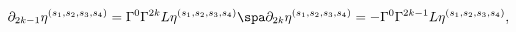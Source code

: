 \begin{equation}
\label{spacecomp1}
\partial_{2k-1} \eta^{(s_1,s_2,s_3,s_4)}
= \Gamma^0 \Gamma^{2k} L \eta^{(s_1,s_2,s_3,s_4)}
\spa 
\partial_{2k} \eta^{(s_1,s_2,s_3,s_4)}
= - \Gamma^0 \Gamma^{2k-1} L \eta^{(s_1,s_2,s_3,s_4)},
\end{equation}

